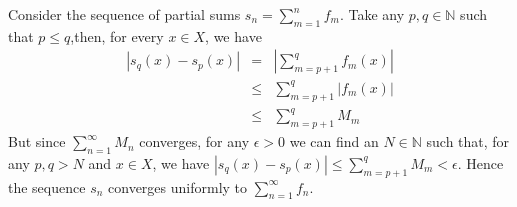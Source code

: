 \documentclass[12pt]{article}
\def\N{\mathbb{N}}
\def\eps{\epsilon}
\begin{document}
Consider the sequence of partial sums $s_n=\sum_{m=1}^n f_m$.
Take any $p,q\in\N$ such that $p\le q$,then, for every $x\in X$, we have
\begin{eqnarray*}
	|s_q(x)-s_p(x)| &=& \left|\sum_{m=p+1}^q f_m(x)\right| \\
		&\le& \sum_{m=p+1}^q |f_m(x)| \\
		&\le& \sum_{m=p+1}^q M_m
\end{eqnarray*}
But since $\sum_{n=1}^\infty M_n$ converges, for any $\eps>0$ we can
find an $N\in\N$ such that, for any $p,q>N$ and $x\in X$, we have
$|s_q(x)-s_p(x)|\le\sum_{m=p+1}^q M_m<\eps$. Hence the sequence
$s_n$ converges uniformly to $\sum_{n=1}^\infty f_n$.
\end{document}
